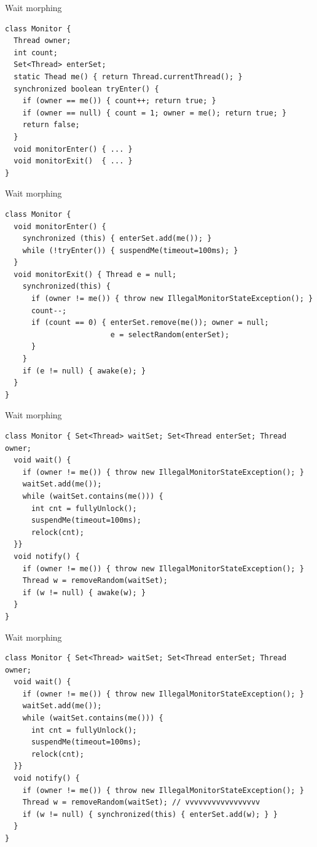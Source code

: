 \begin{frame}[t,fragile]{Wait morphing}

\begin{verbatim}
class Monitor {    
  Thread owner; 
  int count;
  Set<Thread> enterSet; 
  static Thead me() { return Thread.currentThread(); }
  synchronized boolean tryEnter() {
    if (owner == me()) { count++; return true; }
    if (owner == null) { count = 1; owner = me(); return true; }
    return false;
  }
  void monitorEnter() { ... }    
  void monitorExit()  { ... }  
}
\end{verbatim}
\end{frame}

\begin{frame}{Wait morphing}

\begin{verbatim}
class Monitor {  
  void monitorEnter() {
    synchronized (this) { enterSet.add(me()); }
    while (!tryEnter()) { suspendMe(timeout=100ms); }
  }
  void monitorExit() { Thread e = null;
    synchronized(this) { 
      if (owner != me()) { throw new IllegalMonitorStateException(); }
      count--;
      if (count == 0) { enterSet.remove(me()); owner = null;
                        e = selectRandom(enterSet);
      }
    }
    if (e != null) { awake(e); }
  }
}
\end{verbatim}
\end{frame}

\begin{frame}{Wait morphing}

\begin{verbatim}
class Monitor { Set<Thread> waitSet; Set<Thread enterSet; Thread owner;
  void wait() {
    if (owner != me()) { throw new IllegalMonitorStateException(); }
    waitSet.add(me());    
    while (waitSet.contains(me())) { 
      int cnt = fullyUnlock();
      suspendMe(timeout=100ms); 
      relock(cnt);
  }}
  void notify() {
    if (owner != me()) { throw new IllegalMonitorStateException(); }
    Thread w = removeRandom(waitSet);
    if (w != null) { awake(w); }
  }
}
\end{verbatim}
\end{frame}

\begin{frame}{Wait morphing}

\begin{verbatim}
class Monitor { Set<Thread> waitSet; Set<Thread enterSet; Thread owner;
  void wait() {
    if (owner != me()) { throw new IllegalMonitorStateException(); }
    waitSet.add(me());    
    while (waitSet.contains(me())) { 
      int cnt = fullyUnlock();
      suspendMe(timeout=100ms); 
      relock(cnt);
  }}
  void notify() {
    if (owner != me()) { throw new IllegalMonitorStateException(); }
    Thread w = removeRandom(waitSet); // vvvvvvvvvvvvvvvvv
    if (w != null) { synchronized(this) { enterSet.add(w); } }
  }
}
\end{verbatim}
\end{frame}

